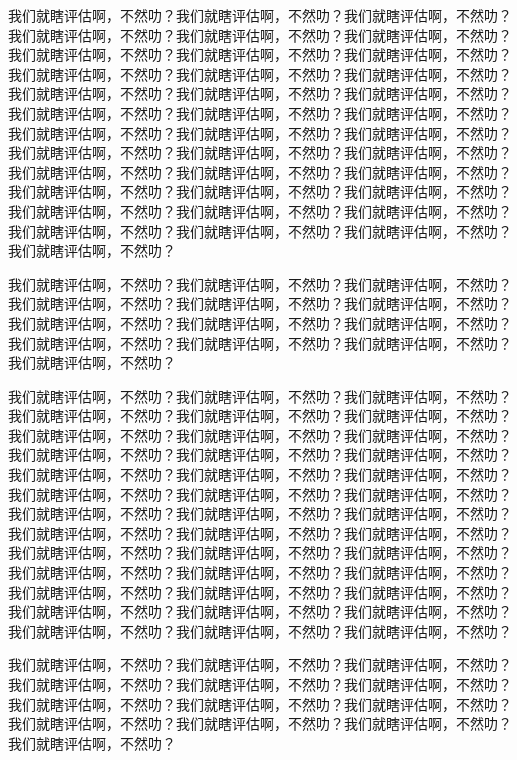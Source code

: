 \documentclass[a4paper,12pt]{book} %
\begin{document}
我们就瞎评估啊，不然叻？我们就瞎评估啊，不然叻？我们就瞎评估啊，不然叻？我们就瞎评估啊，不然叻？我们就瞎评估啊，不然叻？我们就瞎评估啊，不然叻？我们就瞎评估啊，不然叻？我们就瞎评估啊，不然叻？我们就瞎评估啊，不然叻？我们就瞎评估啊，不然叻？我们就瞎评估啊，不然叻？我们就瞎评估啊，不然叻？我们就瞎评估啊，不然叻？我们就瞎评估啊，不然叻？我们就瞎评估啊，不然叻？我们就瞎评估啊，不然叻？我们就瞎评估啊，不然叻？我们就瞎评估啊，不然叻？我们就瞎评估啊，不然叻？我们就瞎评估啊，不然叻？我们就瞎评估啊，不然叻？我们就瞎评估啊，不然叻？我们就瞎评估啊，不然叻？我们就瞎评估啊，不然叻？我们就瞎评估啊，不然叻？我们就瞎评估啊，不然叻？我们就瞎评估啊，不然叻？我们就瞎评估啊，不然叻？我们就瞎评估啊，不然叻？我们就瞎评估啊，不然叻？我们就瞎评估啊，不然叻？我们就瞎评估啊，不然叻？我们就瞎评估啊，不然叻？我们就瞎评估啊，不然叻？我们就瞎评估啊，不然叻？我们就瞎评估啊，不然叻？我们就瞎评估啊，不然叻？

我们就瞎评估啊，不然叻？我们就瞎评估啊，不然叻？我们就瞎评估啊，不然叻？我们就瞎评估啊，不然叻？我们就瞎评估啊，不然叻？我们就瞎评估啊，不然叻？我们就瞎评估啊，不然叻？我们就瞎评估啊，不然叻？我们就瞎评估啊，不然叻？我们就瞎评估啊，不然叻？我们就瞎评估啊，不然叻？我们就瞎评估啊，不然叻？我们就瞎评估啊，不然叻？

我们就瞎评估啊，不然叻？我们就瞎评估啊，不然叻？我们就瞎评估啊，不然叻？我们就瞎评估啊，不然叻？我们就瞎评估啊，不然叻？我们就瞎评估啊，不然叻？我们就瞎评估啊，不然叻？我们就瞎评估啊，不然叻？我们就瞎评估啊，不然叻？我们就瞎评估啊，不然叻？我们就瞎评估啊，不然叻？我们就瞎评估啊，不然叻？我们就瞎评估啊，不然叻？我们就瞎评估啊，不然叻？我们就瞎评估啊，不然叻？我们就瞎评估啊，不然叻？我们就瞎评估啊，不然叻？我们就瞎评估啊，不然叻？我们就瞎评估啊，不然叻？我们就瞎评估啊，不然叻？我们就瞎评估啊，不然叻？我们就瞎评估啊，不然叻？我们就瞎评估啊，不然叻？我们就瞎评估啊，不然叻？我们就瞎评估啊，不然叻？我们就瞎评估啊，不然叻？我们就瞎评估啊，不然叻？我们就瞎评估啊，不然叻？我们就瞎评估啊，不然叻？我们就瞎评估啊，不然叻？我们就瞎评估啊，不然叻？我们就瞎评估啊，不然叻？我们就瞎评估啊，不然叻？我们就瞎评估啊，不然叻？我们就瞎评估啊，不然叻？我们就瞎评估啊，不然叻？我们就瞎评估啊，不然叻？我们就瞎评估啊，不然叻？我们就瞎评估啊，不然叻？

我们就瞎评估啊，不然叻？我们就瞎评估啊，不然叻？我们就瞎评估啊，不然叻？我们就瞎评估啊，不然叻？我们就瞎评估啊，不然叻？我们就瞎评估啊，不然叻？我们就瞎评估啊，不然叻？我们就瞎评估啊，不然叻？我们就瞎评估啊，不然叻？我们就瞎评估啊，不然叻？我们就瞎评估啊，不然叻？我们就瞎评估啊，不然叻？我们就瞎评估啊，不然叻？
\end{document}
